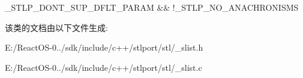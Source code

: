 \+\_\+\+S\+T\+L\+P\+\_\+\+D\+O\+N\+T\+\_\+\+S\+U\+P\+\_\+\+D\+F\+L\+T\+\_\+\+P\+A\+R\+AM \&\& !\+\_\+\+S\+T\+L\+P\+\_\+\+N\+O\+\_\+\+A\+N\+A\+C\+H\+R\+O\+N\+I\+S\+MS 

该类的文档由以下文件生成\+:\begin{DoxyCompactItemize}
\item 
E\+:/\+React\+O\+S-\/0../sdk/include/c++/stlport/stl/\+\_\+slist.\+h\item 
E\+:/\+React\+O\+S-\/0../sdk/include/c++/stlport/stl/\+\_\+slist.\+c\end{DoxyCompactItemize}
